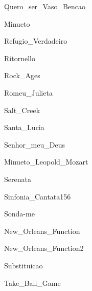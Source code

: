\documentclass{scrartcl}
\begin{document}

{Quero_ser_Vaso_Bencao}


{Minueto}


{Refugio_Verdadeiro}


{Ritornello}


{Rock_Ages}


{Romeu_Julieta}


{Salt_Creek}


{Santa_Lucia}


{Senhor_meu_Deus}


{Minueto_Leopold_Mozart}


{Serenata}


{Sinfonia_Cantata156}


{Sonda-me}


{New_Orleans_Function}


{New_Orleans_Function2}


{Substituicao}


{Take_Ball_Game}
\end{document}
